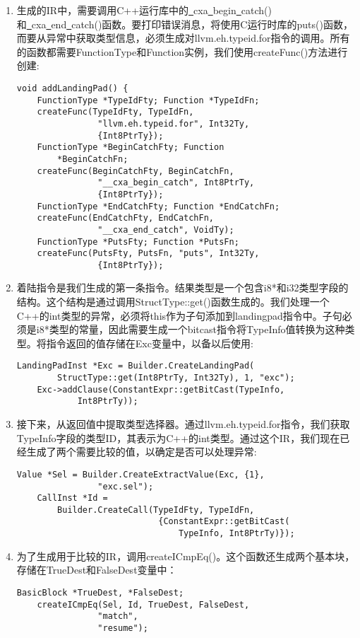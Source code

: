 \begin{enumerate}
\item 生成的IR中，需要调用C++运行库中的\underline{~}cxa\underline{~}begin\underline{~}catch()和\underline{~}cxa\underline{~}end\underline{~}catch()函数。要打印错误消息，将使用C运行时库的puts()函数，而要从异常中获取类型信息，必须生成对llvm.eh.typeid.for指令的调用。所有的函数都需要FunctionType和Function实例，我们使用createFunc()方法进行创建:
\begin{lstlisting}[caption={}]
void addLandingPad() {
	FunctionType *TypeIdFty; Function *TypeIdFn;
	createFunc(TypeIdFty, TypeIdFn,
				"llvm.eh.typeid.for", Int32Ty,
				{Int8PtrTy});
	FunctionType *BeginCatchFty; Function 
		*BeginCatchFn;
	createFunc(BeginCatchFty, BeginCatchFn,
				"__cxa_begin_catch", Int8PtrTy,
				{Int8PtrTy});
	FunctionType *EndCatchFty; Function *EndCatchFn;
	createFunc(EndCatchFty, EndCatchFn,
				"__cxa_end_catch", VoidTy);
	FunctionType *PutsFty; Function *PutsFn;
	createFunc(PutsFty, PutsFn, "puts", Int32Ty,
				{Int8PtrTy});
\end{lstlisting}

\item 着陆指令是我们生成的第一条指令。结果类型是一个包含i8*和i32类型字段的结构。这个结构是通过调用StructType::get()函数生成的。我们处理一个C++的int类型的异常，必须将this作为子句添加到landingpad指令中。子句必须是i8*类型的常量，因此需要生成一个bitcast指令将TypeInfo值转换为这种类型。将指令返回的值存储在Exc变量中，以备以后使用:
\begin{lstlisting}[caption={}]
	LandingPadInst *Exc = Builder.CreateLandingPad(
		StructType::get(Int8PtrTy, Int32Ty), 1, "exc");
	Exc->addClause(ConstantExpr::getBitCast(TypeInfo, 
			Int8PtrTy));
\end{lstlisting}

\item 接下来，从返回值中提取类型选择器。通过llvm.eh.typeid.for指令，我们获取TypeInfo字段的类型ID，其表示为C++的int类型。通过这个IR，我们现在已经生成了两个需要比较的值，以确定是否可以处理异常:
\begin{lstlisting}[caption={}]
	Value *Sel = Builder.CreateExtractValue(Exc, {1}, 
				"exc.sel");
	CallInst *Id =
		Builder.CreateCall(TypeIdFty, TypeIdFn,
							{ConstantExpr::getBitCast(
								TypeInfo, Int8PtrTy)});
\end{lstlisting}

\item 为了生成用于比较的IR，调用createICmpEq()。这个函数还生成两个基本块，存储在TrueDest和FalseDest变量中：
\begin{lstlisting}[caption={}]
	BasicBlock *TrueDest, *FalseDest;
	createICmpEq(Sel, Id, TrueDest, FalseDest, 
				"match",
				"resume");
\end{lstlisting}


\end{enumerate}
